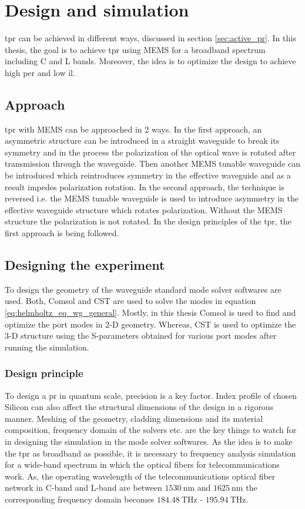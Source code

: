 \documentclass[../report.tex]{subfiles}
\begin{document}
	

\chapter{Design and simulation}
\gls{tpr} can be achieved in different ways, discussed in section \ref*{sec:active_pr}. In this thesis, the goal is to achieve \gls{tpr} using MEMS for a broadband spectrum including C and L bands. Moreover, the idea is to optimize the design to achieve high \gls{per} and low \gls{il}.  
	
	\section{Approach}
	\gls{tpr} with MEMS can be approached in 2 ways. In the first approach, an asymmetric structure can be introduced in a straight waveguide to break its symmetry and in the process the polarization of the optical wave is rotated after transmission through the waveguide. Then another MEMS tunable waveguide can be introduced which reintroduces symmetry in the effective waveguide and as a result impedes polarization rotation. In the second approach, the technique is reversed i.e. the MEMS tunable waveguide is used to introduce asymmetry in the effective waveguide structure which rotates polarization. Without the MEMS structure the polarization is not rotated. In the design principles of the \gls{tpr}, the first approach is being followed.  
	
	\section{Designing the experiment}
	To design the geometry of the waveguide standard mode solver softwares are used. Both, Comsol\cite{comsol_2015} and CST \cite{cst_2015} are used to solve the modes in equation \ref{eq:helmholtz_eq_wg_general}. Mostly, in this thesis Comsol is used to find and optimize the port modes in 2-D geometry. Whereas, CST is used to optimize the 3-D structure using the S-parameters obtained for various port modes after running the simulation. 
		
		\subsection{Design principle}
To design a \gls{pr} in quantum scale, precision is a key factor. Index profile of chosen Silicon can also affect the structural dimensions of the design in a rigorous manner. Meshing of the geometry, cladding dimensions and its material composition, frequency domain of the solvers etc. are the key things to watch for in designing the simulation in the mode solver softwares. As the idea is to make the \gls{tpr} as broadband as possible, it is necessary to frequency analysis simulation for a wide-band spectrum in which the optical fibers for telecommunications work. As, the operating wavelength of the telecommunications optical fiber network in C-band and L-band are between $\SI{1530}{\nano\metre}$ and $\SI{1625}{\nano\metre}$ the corresponding frequency domain becomes $\SI{184.48}{\THz}$ - $\SI{195.94}{\THz}$.
	
\end{document}
